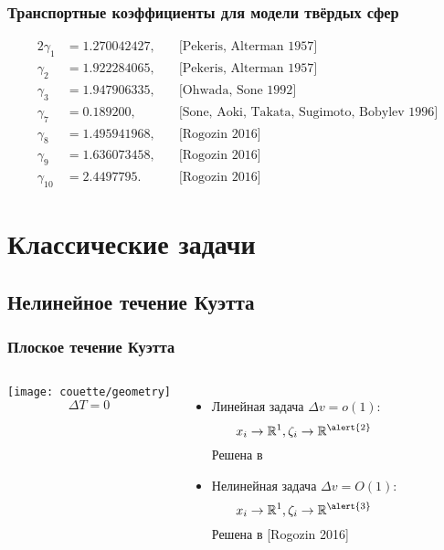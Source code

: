 \documentclass[mathserif]{beamer} %
\newcommand{\OO}[1]{O(#1)}
\begin{document}
\begin{frame}
    \frametitle{Транспортные коэффициенты для модели твёрдых сфер}
    \begin{alignat*}{2}
        \gamma_1 &= 1.270042427, \quad &\text{[Pekeris, Alterman 1957]} \\
        \gamma_2 &= 1.922284065, \quad &\text{[Pekeris, Alterman 1957]} \\
        \gamma_3 &= 1.947906335, \quad &\text{[Ohwada, Sone 1992]} \\
        \gamma_7 &= 0.189200,    \quad &\text{[Sone, Aoki, Takata, Sugimoto, Bobylev 1996]} \\
        \gamma_8 &= 1.495941968, \quad &\text{[Rogozin 2016]} \\
        \gamma_9 &= 1.636073458, \quad &\text{[Rogozin 2016]} \\
        \gamma_{10} &= 2.4497795.\quad &\text{[Rogozin 2016]}
    \end{alignat*}
\end{frame}

\section{Классические задачи}
\subsection{Нелинейное течение Куэтта}

\begin{frame}
    \frametitle{Плоское течение Куэтта}
    \begin{columns}
        \hspace{-10pt}\texttt{[image: couette/geometry]}
        \[\Delta{T} = 0\]
        \begin{itemize}
            \item Линейная задача \(\Delta{v} = o(1)\): \[ x_i\to\mathbb{R}^1, \zeta_i\to\mathbb{R}^{\alert{2}}\]
            Решена в 
            \bigskip
            \item Нелинейная задача \(\Delta{v} = \OO{1}\): \[ x_i\to\mathbb{R}^1, \zeta_i\to\mathbb{R}^{\alert{3}} \]
            Решена в [Rogozin 2016]
        \end{itemize}
    \end{columns}
\end{frame}
\end{document}
